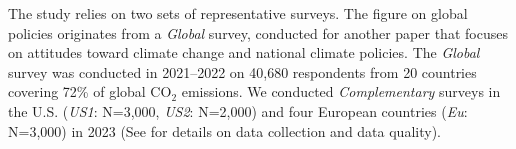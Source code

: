 
The study relies on two sets of representative surveys. 
The figure on global policies originates from a %
\textit{Global} survey, 
conducted for %
another paper that focuses on attitudes toward climate change and national climate policies.\cite{dechezlepretre_fighting_2022} %
The \textit{Global} survey was conducted in 2021--2022 on 40,680 respondents from 20 countries covering 72\% of global CO$_\text{2}$ emissions. 
We conducted 
\textit{Complementary} surveys in the U.S. (\textit{US1}: N=3,000, \textit{US2}: N=2,000) and four European countries (\textit{Eu}: N=3,000) %
in 2023 (See  for details on data collection and data quality).%

